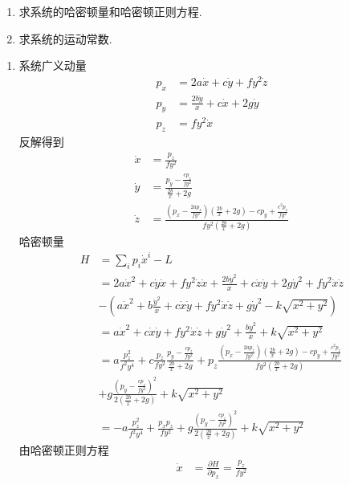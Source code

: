 \begin{enumerate}[label=(\arabic*)]
\item 求系统的哈密顿量和哈密顿正则方程.

\item 求系统的运动常数.
\end{enumerate}
\begin{solution}
    \begin{enumerate}[label=(\arabic*)]
    \item 系统广义动量
    \begin{align*}
        p_x&=2a\dot x+c\dot y+fy^2\dot z\\
        p_y&=\frac{2b\dot y}{x}+c\dot x+2g\dot y\\
        p_z&=fy^2\dot x
    \end{align*}
    反解得到
    \begin{align*}
        \dot x&=\frac{p_z}{fy^2}\\
        \dot y&=\frac{p_y-\frac{cp_z}{fy^2}}{\frac{2b}{x}+2g}\\
        \dot z&=\frac{(p_x-\frac{2ap_z}{fy^2})(\frac{2b}{x}+2g)-cp_y+\frac{c^2p_z}{fy^2}}{fy^2(\frac{2b}{x}+2g)}
    \end{align*}
    哈密顿量
    \begin{align*}
        H&=\sum_{i}p_i\dot x^i-L\\&=2a\dot x^2+c\dot y\dot x+fy^2\dot z\dot x+\frac{2b\dot y^2}{x}+c\dot x\dot y+2g\dot y^2+fy^2\dot x\dot z\\&-(a\dot x^2+b\frac{\dot y^2}{x}+c\dot x\dot y+fy^2\dot x\dot z+g\dot y^2-k\sqrt{x^2+y^2})\\&=a\dot x^2+c\dot x\dot y+fy^2\dot x\dot z+g\dot y^2+\frac{b\dot y^2}{x}+k\sqrt{x^2+y^2}\\&=a\frac{p_z^2}{f^2y^4}+c\frac{p_z}{fy^2}\frac{p_y-\frac{cp_z}{fy^2}}{\frac{2b}{x}+2g}+p_z\frac{(p_x-\frac{2ap_z}{fy^2})(\frac{2b}{x}+2g)-cp_y+\frac{c^2p_z}{fy^2}}{fy^2(\frac{2b}{x}+2g)}\\&+g\frac{(p_y-\frac{cp_z}{fy^2})^2}{2(\frac{2b}{x}+2g)}+k\sqrt{x^2+y^2}\\&=-a\frac{p_z^2}{f^2y^4}+\frac{p_xp_z}{fy^2}+g\frac{(p_y-\frac{cp_z}{fy^2})^2}{2(\frac{2b}{x}+2g)}+k\sqrt{x^2+y^2}
    \end{align*}
    由哈密顿正则方程
    \begin{align*}
        \dot x&=\frac{\partial H}{\partial p_x}=\frac{p_z}{fy^2}\\

\end{align*}
\end{enumerate}
\end{solution}
